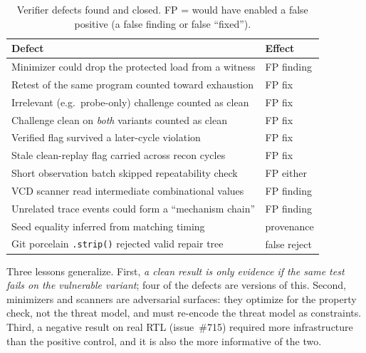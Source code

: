 \documentclass[conference,10pt]{IEEEtran}
\begin{document}
\begin{table}[t]
\centering
\caption{Verifier defects found and closed. FP = would have enabled a false
positive (a false finding or false ``fixed'').}
\label{tab:lessons}
\footnotesize
\setlength{\tabcolsep}{3pt}
\begin{tabular}{@{}p{}p{}@{}}
\toprule
Defect & Effect \\
\midrule
Minimizer could drop the protected load from a witness & FP finding \\
Retest of the same program counted toward exhaustion & FP fix \\
Irrelevant (e.g.\ probe-only) challenge counted as clean & FP fix \\
Challenge clean on \emph{both} variants counted as clean & FP fix \\
Verified flag survived a later-cycle violation & FP fix \\
Stale clean-replay flag carried across recon cycles & FP fix \\
Short observation batch skipped repeatability check & FP either \\
VCD scanner read intermediate combinational values & FP finding \\
Unrelated trace events could form a ``mechanism chain'' & FP finding \\
Seed equality inferred from matching timing & provenance \\
Git porcelain \texttt{.strip()} rejected valid repair tree & false reject \\
\bottomrule
\end{tabular}
\end{table}

Three lessons generalize. First, \emph{a clean result is only evidence if the
same test fails on the vulnerable variant}; four of the defects are versions
of this. Second, minimizers and scanners are adversarial surfaces: they
optimize for the property check, not the threat model, and must re-encode the
threat model as constraints. Third, a negative result on real RTL (issue~\#715)
required more infrastructure than the positive control, and it is also the
more informative of the two.
\end{document}
